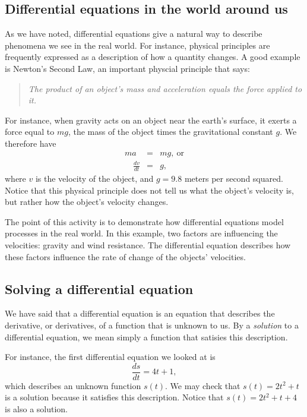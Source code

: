 

\subsection*{Differential equations in the world around us}

As we have noted, differential equations give a natural way to
describe phenomena we see in the real world.  For instance, physical
principles are frequently expressed as a description of how a quantity
changes.  A good example is Newton's Second Law, an important physcial
principle that says:  

\begin{quote} {\em
    The product of an object's
    mass and acceleration equals the force applied to it.
}
\end{quote}

For instance, when gravity acts on an object near the earth's surface,
it exerts a force equal to $mg$, the mass of the object times the
gravitational constant $g$.  We therefore have
\begin{eqnarray*}
ma & = & mg, \ \mbox{or} \\
\quad \frac{dv}{dt} & = & g,
\end{eqnarray*}
where $v$ is the velocity of the object, and $g = 9.8$ meters per
second squared.  Notice that this physical principle does not tell us
what the object's 
velocity is, but rather how the object's velocity changes.  




The point of this activity is to demonstrate how differential
equations model processes in the real world.  In this example, two
factors are influencing the velocities:  gravity and wind resistance.
The differential equation describes how these factors influence the
rate of change of the objects' velocities.

\subsection*{Solving a differential equation} 

We have said that a differential equation is an equation that
describes the derivative, 
or derivatives, of a function that is unknown to us.  By a {\em
  solution} to a differential equation, we mean simply a function that
satisies this description.

For instance, the first differential equation we looked at is
$$
\frac{ds}{dt} = 4t+1,
$$
which describes an unknown function $s(t)$.  We may check that $s(t) =
2t^2+t$ is a solution because it satisfies this description.  Notice
that $s(t) = 2t^2+t+4$ is also a solution.

